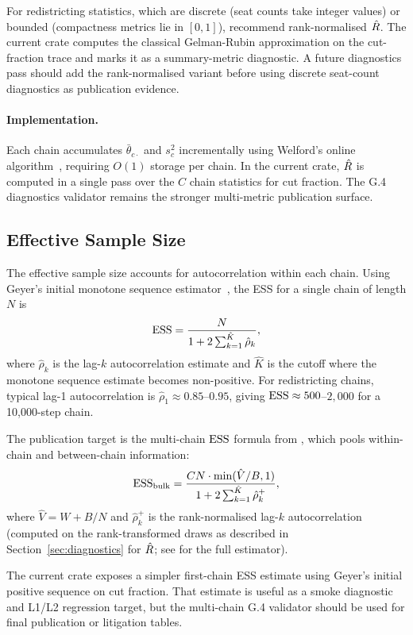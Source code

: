 For redistricting statistics, which are discrete (seat counts take
integer values) or bounded (compactness metrics lie in $[0,1]$),
\citet{vehtari2021rank} recommend rank-normalised $\hat{R}$.
The current \re{} crate computes the classical Gelman-Rubin approximation on
the cut-fraction trace and marks it as a summary-metric diagnostic. A future
diagnostics pass should add the rank-normalised variant before using discrete
seat-count diagnostics as publication evidence.

\paragraph{Implementation.}
Each chain accumulates $\bar{\theta}_{c\cdot}$ and $s_c^2$ incrementally
using Welford's online algorithm~\citep{welford1962note}, requiring $O(1)$
storage per chain.
In the current crate, $\hat{R}$ is computed in a single pass over the $C$ chain
statistics for cut fraction. The G.4 diagnostics validator remains the
stronger multi-metric publication surface.

\subsection{Effective Sample Size}

The effective sample size accounts for autocorrelation within each chain.
Using Geyer's initial monotone sequence estimator~\citep{geyer1992practical},
the ESS for a single chain of length $N$ is
\[
  \mathrm{ESS} = \frac{N}{1 + 2\sum_{k=1}^{\hat{K}} \hat{\rho}_k},
\]
where $\hat{\rho}_k$ is the lag-$k$ autocorrelation estimate and
$\hat{K}$ is the cutoff where the monotone sequence estimate becomes
non-positive.
For redistricting chains, typical lag-1 autocorrelation is
$\hat{\rho}_1 \approx 0.85$--$0.95$, giving
$\mathrm{ESS} \approx 500$--$2{,}000$ for a 10{,}000-step chain.

The publication target is the multi-chain $\mathrm{ESS}$ formula from
\citet{vehtari2021rank}, which pools within-chain and between-chain
information:
\[
  \mathrm{ESS}_{\text{bulk}} = \frac{CN \cdot \min(\hat{V}/B, 1)}{1 + 2\sum_{k=1}^{\hat{K}}\hat{\rho}_k^+},
\]
where $\hat{V} = W + B/N$ and $\hat{\rho}_k^+$ is the rank-normalised
lag-$k$ autocorrelation (computed on the rank-transformed draws as
described in Section~\ref{sec:diagnostics} for $\hat{R}$;
see \citealt{vehtari2021rank} for the full estimator).

The current crate exposes a simpler first-chain ESS estimate using Geyer's
initial positive sequence on cut fraction. That estimate is useful as a smoke
diagnostic and L1/L2 regression target, but the multi-chain G.4 validator
should be used for final publication or litigation tables.

